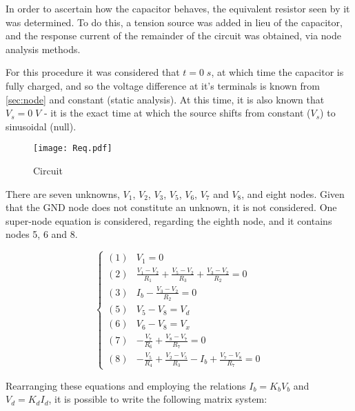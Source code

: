 In order to ascertain how the capacitor behaves, the equivalent resistor seen by it was determined. To do this, a tension source was added in lieu of the capacitor, and the response current of the remainder of the circuit was obtained, via node analysis methods.

For this procedure it was considered that $t=0\;s$, at which time the capacitor is fully charged, and so the voltage difference at it's terminals is known from \ref{sec:node} and constant (static analysis). At this time, it is also known that $V_s=0\;V$ - it is the exact time at which the source shifts from constant ($V_s$) to sinusoidal (null).

\begin{figure}[H]
  \centering
  \texttt{[image: Req.pdf]}
  \caption{Circuit}
  \label{Req_fig}
\end{figure}

There are seven unknowns, $V_1$, $V_2$, $V_3$, $V_5$, $V_6$, $V_7$ and $V_8$, and eight nodes. Given that the GND node does not constitute an unknown, it is not considered. One super-node equation is considered, regarding the eighth node, and it contains nodes 5, 6 and 8.

\begin{equation}
  \begin{cases}
    (1) & V_1=0 \\
    (2) & \frac{V_1-V_2}{R_1} + \frac{V_5-V_2}{R_3} + \frac{V_3-V_2}{R_2} = 0 \\
    (3) & I_b - \frac{V_3-V_2}{R_2} = 0 \\
    (5) & V_5-V_8 = V_d \\
    (6) & V_6-V_8 = V_x \\
    (7) & -\frac{V_7}{R_6} + \frac{V_8-V_7}{R_7} = 0 \\
    (8) & -\frac{V_5}{R_4}+\frac{V_2-V_5}{R_3}-I_b+\frac{V_7-V_8}{R_7} = 0
  \end{cases}
\end{equation}

Rearranging these equations and employing the relations $I_b = K_bV_b$ and $V_d = K_dI_d$, it is possible to write the following matrix system:

